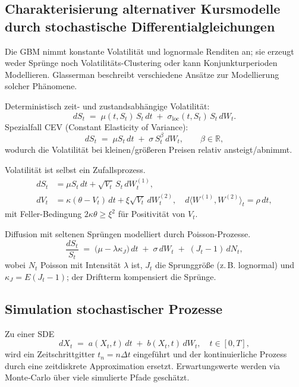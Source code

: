 \subsection{Charakterisierung alternativer Kursmodelle durch stochastische Differentialgleichungen}

Die GBM nimmt konstante Volatilität und lognormale Renditen an; sie erzeugt weder 
Sprünge noch Volatilitäts-Clustering oder kann Konjunkturperioden Modellieren.
Glasserman \cite{glasserman2003monte} beschreibt verschiedene Ansätze zur Modellierung solcher Phänomene. 

\begin{bsp}
Deterministisch zeit- und zustandsabhängige Volatilität:
$$
dS_t \;=\; \mu(t,S_t)\,S_t\,dt \;+\; \sigma_{\mathrm{loc}}(t,S_t)\,S_t\,dW_t.
$$
Spezialfall CEV (Constant Elasticity of Variance):
$$
dS_t \;=\; \mu S_t\,dt \;+\; \sigma\,S_t^{\beta}\,dW_t,\qquad \beta\in\mathbb R,
$$
wodurch die Volatilität bei kleinen/größeren Preisen relativ ansteigt/abnimmt.
\end{bsp}

\begin{bsp}
Volatilität ist selbst ein Zufallsprozess.
$$
\begin{aligned}
dS_t &= \mu S_t\,dt + \sqrt{V_t}\,S_t\,dW_t^{(1)},\\
dV_t &= \kappa(\theta - V_t)\,dt + \xi\sqrt{V_t}\,dW_t^{(2)},\quad d \langle W^{(1)},W^{(2)}\rangle_t=\rho\,dt,
\end{aligned}
$$
mit Feller-Bedingung $2\kappa\theta\ge \xi^2$ für Positivität von $V_t$.
\end{bsp}

\begin{bsp}
Diffusion mit seltenen Sprüngen modelliert durch Poisson-Prozesse.
$$
\frac{dS_t}{S_t} \;=\; \big(\mu - \lambda \kappa_J\big)\,dt \;+\; \sigma\,dW_t \;+\; (J_t-1)\,dN_t,
$$
wobei $N_t$ Poisson mit Intensität $\lambda$ ist, $J_t$ die Sprunggröße (z.\,B. lognormal) 
und $\kappa_J= E(J_t-1)$; der Driftterm kompensiert die Sprünge.
\end{bsp}

\subsection{Simulation stochastischer Prozesse}
Zu einer SDE
$$
dX_t \;=\; a(X_t,t)\,dt \;+\; b(X_t,t)\,dW_t,\quad t\in[0,T],
$$
wird ein Zeitschrittgitter $t_n=n\Delta t$ eingeführt und der kontinuierliche Prozess durch eine zeitdiskrete Approximation ersetzt. Erwartungswerte werden via Monte‑Carlo über viele simulierte Pfade geschätzt.

